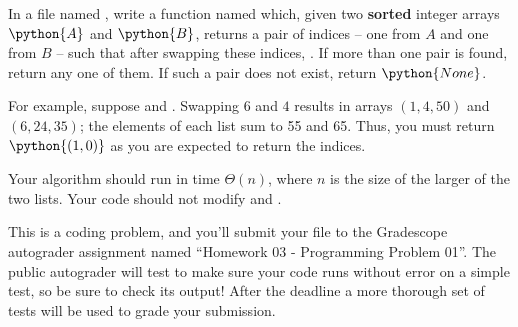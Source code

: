 \begin{progprob}
    In a file named , write a function named
     which, given two \textbf{sorted} integer arrays
    $\python{A}$ and $\python{B}$, returns a pair of indices  -- one from $A$ and one from $B$ -- such that after swapping these
    indices, . If more than one pair is found,
    return any one of them. If such a pair does not exist, return
    $\python{None}$. 

    For example, suppose  and .
    Swapping $6$ and $4$ results in arrays $(1, 4, 50)$ and $(6, 24, 35)$; the
    elements of each list sum to 55 and 65. Thus, you must return $\python{(1,
    0)}$ as you are expected to return the indices. 

    Your algorithm should run in time $\Theta(n)$, where $n$ is the size of the
    larger of the two lists. Your code should not modify  and .

    

    This is a coding problem, and you'll submit your 
    file to the Gradescope autograder assignment named ``Homework 03 -
    Programming Problem 01''. The public autograder will test to make sure your
    code runs without error on a simple test, so be sure to check its output!
    After the deadline a more thorough set of tests will be used to grade your
    submission.

    \begin{soln}

        \inputminted{python}{\thisdir/include-solution/swap_sum.py}

    \end{soln}
\end{progprob}
